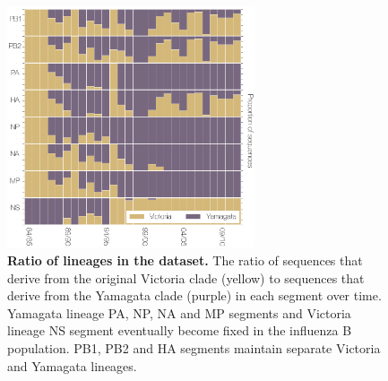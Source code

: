 \documentclass[11pt,oneside,letterpaper]{article}
\begin{document}
\begin{figure}[h]
	\centering	
	\includegraphics[width=0.65\textwidth]	{figures/InfB_LineageRatiosOverTime.png}
	\caption{\textbf{Ratio of lineages in the dataset.}
The ratio of sequences that derive from the original Victoria clade (yellow) to sequences that derive from the Yamagata clade (purple) in each segment over time.
Yamagata lineage PA, NP, NA and MP segments and Victoria lineage NS segment eventually become fixed in the influenza B population.
PB1, PB2 and HA segments maintain separate Victoria and Yamagata lineages.}
	\label{lineageRatiosOverTime}
\end{figure}
\end{document}

